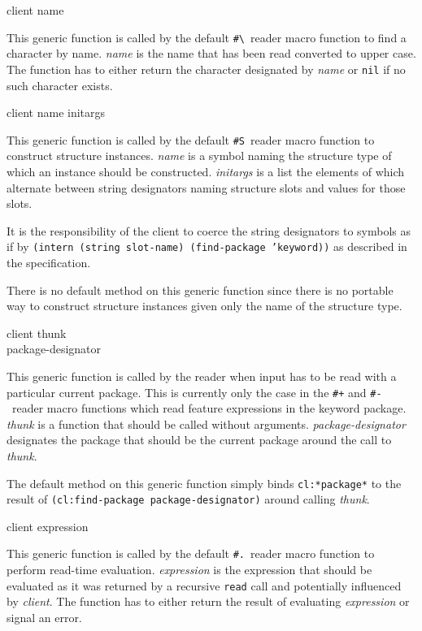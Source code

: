  {client name}

This generic function is called by the default
\texttt{\#\textbackslash}~reader macro function to find a character by
name.  \textit{name} is the name that has been read converted to upper
case.  The function has to either return the character designated by
\textit{name} or \texttt{nil} if no such character exists.

 {client name initargs}

This generic function is called by the default \texttt{\#S}~reader
macro function to construct structure instances.  \textit{name} is a
symbol naming the structure type of which an instance should be
constructed.  \textit{initargs} is a list the elements of which
alternate between string designators naming structure slots and values
for those slots.

It is the responsibility of the client to coerce the string
designators to symbols as if by \texttt{(intern (string slot-name)
  (find-package 'keyword))} as described in the \commonlisp{}
specification.

There is no default method on this generic function since there is no
portable way to construct structure instances given only the name of
the structure type.

 {client thunk \\
  package-designator}

This generic function is called by the reader when input has to be
read with a particular current package.  This is currently only the
case in the \texttt{\#+} and \texttt{\#-}~reader macro functions which
read feature expressions in the keyword package.  \textit{thunk} is a
function that should be called without arguments.
\textit{package-designator} designates the package that should be the
current package around the call to \textit{thunk}.

The default method on this generic function simply binds
\texttt{cl:*package*} to the result of \texttt{(cl:find-package
  package-designator)} around calling \textit{thunk}.

 {client expression}

This generic function is called by the default \texttt{\#.}~reader
macro function to perform read-time evaluation.  \textit{expression}
is the expression that should be evaluated as it was returned by a
recursive \texttt{read} call and potentially influenced by
\textit{client}.  The function has to either return the result of
evaluating \textit{expression} or signal an error.

